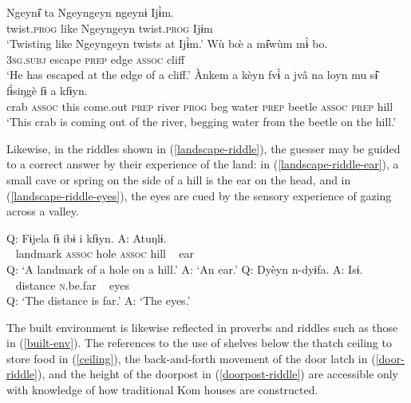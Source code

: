 \documentclass[output=paper,colorlinks,citecolor=brown
]{langscibook}
\begin{document}
\ea \label{ex:landscape}
\begin{xlist}
\ex \label{ex:ngeyngeyn}
\gll  Ngeynɨ̂ ta Ngeyngeyn ngeynɨ Ijɨ̀m.\\
twist.\textsc{prog} like Ngeyngeyn twist.\textsc{prog} Ijɨm\\
\glt  `Twisting like Ngeyngeyn twists at Ijɨ̀m.'
\ex \label{ex:miwum}
\gll Wù bœ̀ a mɨ̂wùm mɨ̀ bo.\\
\textsc{3sg.subj} escape \textsc{prep} edge \textsc{assoc} cliff\\
\glt `He has escaped at the edge of a cliff.'
\ex \label{ex:fisinge}
\gll Ànkem a kèyn fvɨ̀ a jvâ na loyn mu sɨ̂ fɨ̀siŋgè fɨ a kfɨyn.\\
crab \textsc{assoc} this come.out \textsc{prep} river \textsc{prog} beg water \textsc{prep} beetle \textsc{assoc} \textsc{prep} hill\\
\glt `This crab is coming out of the river, begging water from the beetle on the hill.' 
\end{xlist}
\z

\noindent Likewise, in the riddles shown in (\ref{landscape-riddle}), the guesser may be guided to a correct answer by their experience of the land: in (\ref{landscape-riddle-ear}), a small cave or spring on the side of a hill is the ear on the head, and in (\ref{landscape-riddle-eyes}), the eyes are cued by the sensory experience of gazing across a valley. 

\ea \label{landscape-riddle}
\begin{xlist}
\ex \label{landscape-riddle-ear}
\gll  Q: Fɨjela fɨ ibɨ i kfɨyn. A: Atuŋlɨ.\\
{~} landmark \textsc{assoc} hole \textsc{assoc} hill {~} ear\\
\glt  Q: `A landmark of a hole on a hill.' A: `An ear.'
\ex \label{landscape-riddle-eyes}
\gll Q: Dyèyn n-dyɨfa. A: Isɨ.\\
{~} distance \textsc{n}.be.far {~} eyes\\
\glt Q: `The distance is far.' A: `The eyes.'
\end{xlist}
\z

The built environment is likewise reflected in proverbs and riddles such as those in (\ref{built-env}). 
The references to the use of shelves below the thatch ceiling to store food in (\ref{ceiling}), the back-and-forth movement of the door latch in (\ref{door-riddle}), and the height of the doorpost in (\ref{doorpost-riddle}) are accessible only with knowledge of how traditional Kom houses are constructed.
\end{document}
